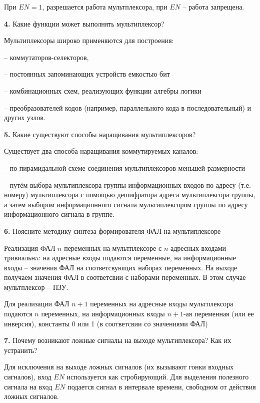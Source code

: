 \noindent При $EN = 1$, разрешается работа мультплексора, при $EN$ -- работа запрещена.\newline

\noindent\textbf{4.} Какие функции может выполнять мультиплексор?\newline

\noindent Мультиплексоры широко применяются для построения:\newline

\noindent -- коммутаторов-селекторов,

\noindent -- постоянных запоминающих устройств емкостью бит

\noindent -- комбинационных схем, реализующих функции алгебры логики

\noindent -- преобразователей кодов (например, параллельного кода в последовательный) и других узлов.

\noindent\textbf{5.} Какие существуют способы наращивания мультиплексоров?\newline

\noindent Существует два способа наращивания коммутируемых каналов:\newline

\noindent -- по пирамидальной схеме соединения мультиплексоров меньшей размерности

\noindent -- путём выбора мультиплексора группы информационных входов по адресу (т.е. номеру) мультиплексора с помощью дешифратора адреса мультиплексора группы, а затем выбором информационного сигнала мультиплексором группы по адресу информационного сигнала в группе.\newline

\noindent\textbf{6.} Поясните методику синтеза формирователя ФАЛ на мультиплексоре\newline

\noindent Реализация ФАЛ $n$ переменных на мультплексоре с $n$ адресных входами тривиальнa: на адресные входы подаются переменные, на информационные входы -- значения ФАЛ на соответсвующих наборах переменных. На выходе получаем значения ФАЛ в соответсвии с наборами переменных. В этом случае мультплексор -- ПЗУ.\newline

\noindent Для реализации ФАЛ $n + 1$ переменных на адресные входы мультплексора подаются $n$ переменных, на информационных входы $n + 1$-ая переменная (или ее инверсия), константы 0 или 1 (в соответсвии со значениями ФАЛ)\newline

\noindent\textbf{7. } Почему возникают ложные сигналы на выходе мультиплексора? Как их устранить?\newline

\noindent Для исключения на выходе ложных сигналов (их вызывают гонки входных сигналов), вход $EN$ используется как стробирующий. Для выделения полезного сигнала на вход $EN$ подается сигнал в интервале времени, свободном от действия ложных сигналов.

